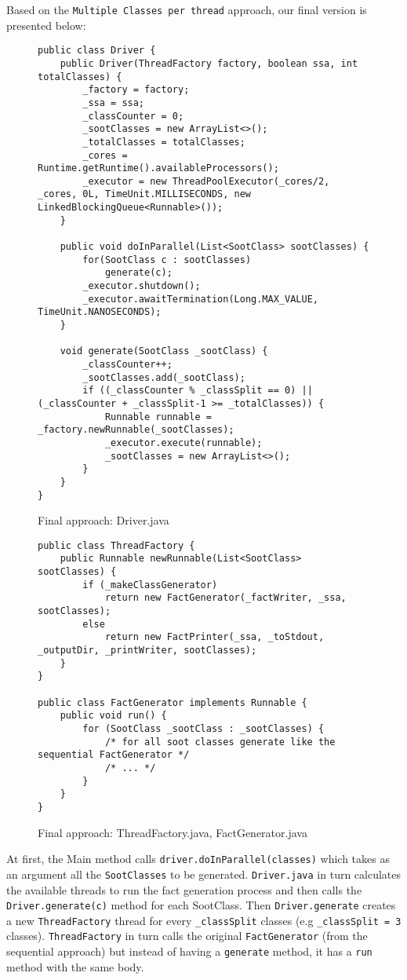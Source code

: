 \documentclass{dithesis}
\begin{document}
        Based on the \texttt{Multiple Classes per thread} approach, our final version is presented below:
                \begin{figure}[H]
\begin{lstlisting}
public class Driver {
    public Driver(ThreadFactory factory, boolean ssa, int totalClasses) {
        _factory = factory;
        _ssa = ssa;
        _classCounter = 0;
        _sootClasses = new ArrayList<>();
        _totalClasses = totalClasses;
        _cores = Runtime.getRuntime().availableProcessors();
        _executor = new ThreadPoolExecutor(_cores/2, _cores, 0L, TimeUnit.MILLISECONDS, new LinkedBlockingQueue<Runnable>());
    }

    public void doInParallel(List<SootClass> sootClasses) {
        for(SootClass c : sootClasses)
            generate(c);
        _executor.shutdown();
        _executor.awaitTermination(Long.MAX_VALUE, TimeUnit.NANOSECONDS);
    }

    void generate(SootClass _sootClass) {
        _classCounter++;
        _sootClasses.add(_sootClass);
        if ((_classCounter % _classSplit == 0) || (_classCounter + _classSplit-1 >= _totalClasses)) {
            Runnable runnable = _factory.newRunnable(_sootClasses);
            _executor.execute(runnable);
            _sootClasses = new ArrayList<>();
        }
    }
}
\end{lstlisting}
        \caption{Final approach: Driver.java}
        \end{figure}

        \begin{figure}[H]
\begin{lstlisting}
public class ThreadFactory {
    public Runnable newRunnable(List<SootClass> sootClasses) {
        if (_makeClassGenerator)
            return new FactGenerator(_factWriter, _ssa, sootClasses);
        else
            return new FactPrinter(_ssa, _toStdout, _outputDir, _printWriter, sootClasses);
    }
}

public class FactGenerator implements Runnable {
    public void run() {
        for (SootClass _sootClass : _sootClasses) {
            /* for all soot classes generate like the sequential FactGenerator */
            /* ... */
        }
    }
}
\end{lstlisting}
        \caption{Final approach: ThreadFactory.java, FactGenerator.java}
        \end{figure}
        At first, the Main method calls \texttt{driver.doInParallel(classes)} which takes as an argument all the \texttt{SootClasses} to be generated. \texttt{Driver.java} in turn calculates the available threads to run the fact generation process and then calls the \texttt{Driver.generate(c)} method for each SootClass. Then \texttt{Driver.generate} creates a new \texttt{ThreadFactory} thread for every \texttt{\_classSplit} classes (e.g \texttt{\_classSplit = 3} classes). \texttt{ThreadFactory} in turn calls the original \texttt{FactGenerator} (from the sequential approach) but instead of having a \texttt{generate} method, it has a \texttt{run} method with the same body.
\end{document}
